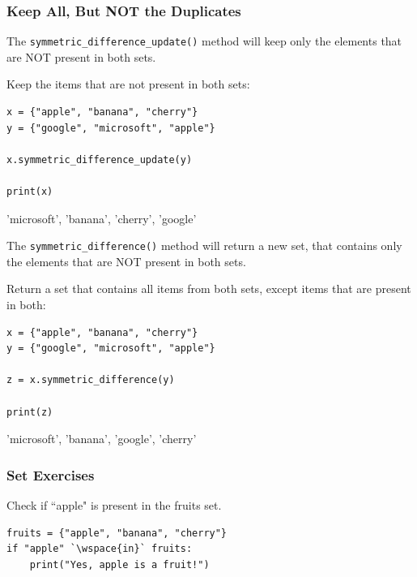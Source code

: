 \documentclass[12pt,a4paper]{article}
\newcommand{\wspace}[1]{%
	\color{white}\colorbox{white}{\texttt{#1}}%
}
\newcommand{\code}[1]{%
	\colorbox{backcolour}{\lstinline{#1}}%
}
\begin{document}
\subsubsection{Keep All, But NOT the Duplicates}

The \code{symmetric_difference_update()} method will keep only the elements
that are NOT present in both sets.

\begin{ebox}
Keep the items that are not present in both sets:
	\begin{lstlisting}
x = {"apple", "banana", "cherry"}
y = {"google", "microsoft", "apple"}

x.symmetric_difference_update(y)

print(x)
	\end{lstlisting}
\tcblower
	\begin{vercode}
{'microsoft', 'banana', 'cherry', 'google'}
	\end{vercode}
\end{ebox}

The \code{symmetric_difference()} method will return a new set, that contains
only the elements that are NOT present in both sets.

\begin{ebox}
Return a set that contains all items from both sets, except items that are present in both:
	\begin{lstlisting}
x = {"apple", "banana", "cherry"}
y = {"google", "microsoft", "apple"}

z = x.symmetric_difference(y)

print(z)
	\end{lstlisting}
\tcblower
	\begin{vercode}
{'microsoft', 'banana', 'google', 'cherry'}
	\end{vercode}
\end{ebox}
\subsubsection{Set Exercises}

\begin{tbox}
	Check if ``apple" is present in the fruits set.

	\begin{lstlisting}
fruits = {"apple", "banana", "cherry"}
if "apple" `\wspace{in}` fruits:
    print("Yes, apple is a fruit!")
	\end{lstlisting}
\end{tbox}
\vfill\newpage
\end{document}
